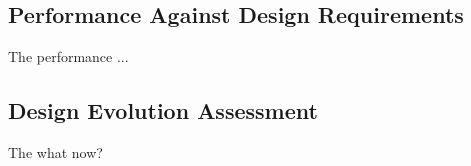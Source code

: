 \subsection{Performance Against Design Requirements}
The performance ...

\subsection{Design Evolution Assessment}
The what now?




%

